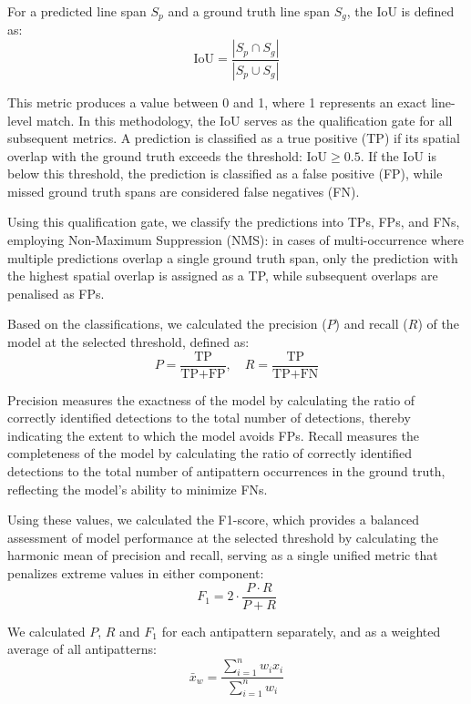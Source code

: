 For a predicted line span \(S_p\) and a ground truth line span \(S_g\), the IoU is defined as:
\begin{equation}
\text{IoU} = \frac{|S_p \cap S_g|}{|S_p \cup S_g|}
\end{equation}

This metric produces a value between \num{0} and \num{1}, where \num{1} represents an exact line-level match. In this methodology, the IoU serves as the qualification gate for all subsequent metrics. A prediction is classified as a true positive (TP) if its spatial overlap with the ground truth exceeds the threshold: \(\text{IoU} \geq 0.5\). If the IoU is below this threshold, the prediction is classified as a false positive (FP), while missed ground truth spans are considered false negatives (FN).

Using this qualification gate, we classify the predictions into TPs, FPs, and FNs, employing Non-Maximum Suppression (NMS): in cases of multi-occurrence where multiple predictions overlap a single ground truth span, only the prediction with the highest spatial overlap is assigned as a TP, while subsequent overlaps are penalised as FPs.

Based on the classifications, we calculated the precision (\(P\)) and recall (\(R\)) of the model at the selected threshold, defined as:
\begin{equation}
P = \frac{\text{TP}}{\text{TP} + \text{FP}}, \quad R = \frac{\text{TP}}{\text{TP} + \text{FN}}
\end{equation}

Precision measures the exactness of the model by calculating the ratio of correctly identified detections to the total number of detections, thereby indicating the extent to which the model avoids FPs. Recall measures the completeness of the model by calculating the ratio of correctly identified detections to the total number of antipattern occurrences in the ground truth, reflecting the model's ability to minimize FNs.

Using these values, we calculated the F1-score, which provides a balanced assessment of model performance at the selected threshold by calculating the harmonic mean of precision and recall, serving as a single unified metric that penalizes extreme values in either component:
\begin{equation}
F_1 = 2 \cdot \frac{P \cdot R}{P + R}
\end{equation}

We calculated \(P\), \(R\) and \(F_1\) for each antipattern separately, and as a weighted average of all antipatterns:
\begin{equation}
\bar{x}_w = \frac{\sum_{i=1}^{n} w_i x_i}{\sum_{i=1}^{n} w_i}
\end{equation}

